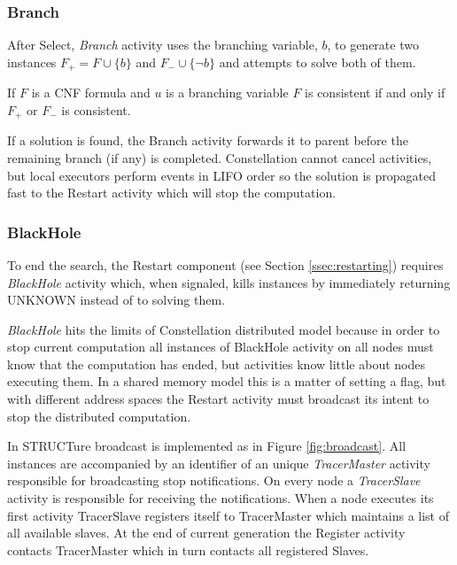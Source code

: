 \subsubsection{Branch}

After Select, \emph{Branch} activity uses the branching variable,
$b$, to generate two instances $F_+ = F \cup \{b\}$ and $F_- \cup
\{\neg b\}$ and attempts to solve both of them.

\begin{myprop}
  If $F$ is a CNF formula and $u$ is a branching variable
  $F$ is consistent if and only if $F_+$ or $F_-$ is consistent.
\end{myprop}

If a solution is found, the Branch activity forwards it to parent before
the remaining branch (if any) is completed. Constellation cannot cancel
activities, but local executors perform events in LIFO order so
the solution is propagated fast to the Restart activity which will stop
the computation.


\subsubsection{BlackHole}
\label{sssec:blackhole}

To end the search, the Restart component (see Section
\ref{ssec:restarting}) requires \emph{BlackHole} activity which, when
signaled, kills instances by immediately returning \textsf{UNKNOWN}
instead of to solving them.

\emph{BlackHole} hits the limits of Constellation distributed
model because in order to stop current computation all instances of
BlackHole activity on all nodes must know that the computation has
ended, but activities know little about nodes executing them. In
a shared memory model this is a matter of setting a flag, but with
different address spaces the Restart activity must broadcast its
intent to stop the distributed computation.

In STRUCTure broadcast is implemented as in Figure
\ref{fig:broadcast}.  All instances are accompanied by an
identifier of an unique \emph{TracerMaster} activity responsible for
broadcasting stop notifications. On every node a \emph{TracerSlave}
activity is responsible for receiving the notifications. When a
node executes its first activity TracerSlave registers itself to
TracerMaster which maintains a list of all available slaves. At the
end of current generation the Register activity contacts TracerMaster
which in turn contacts all registered Slaves.

